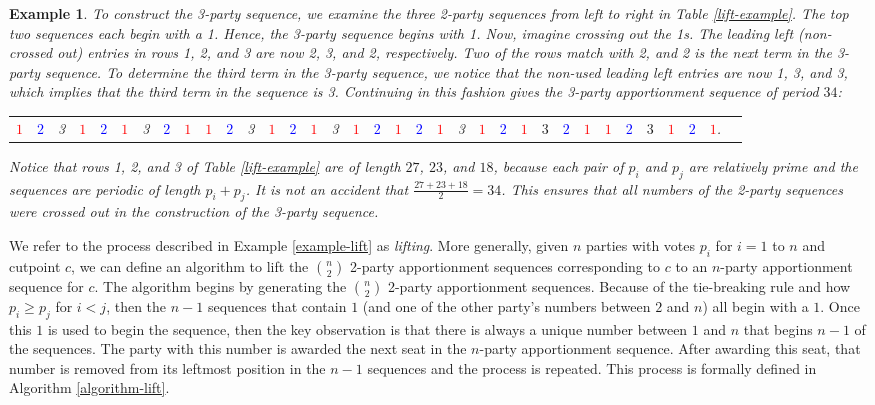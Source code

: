 \documentclass[pdflatex,sn-mathphys-num]{sn-jnl}
\theoremstyle{thmstyleone}%
\theoremstyle{thmstyletwo}%
\newtheorem{example}{Example}%
\theoremstyle{thmstylethree}%
\begin{document}
\begin{example}
To construct the 3-party sequence, we examine the three 2-party sequences from left to right in Table \ref{lift-example}.  The top two sequences each begin with a 1.  Hence, the 3-party sequence begins with 1.  Now, imagine crossing out the 1s. The leading left (non-crossed out) entries in rows 1, 2, and 3 are now 2, 3, and 2, respectively.  Two of the rows match with 2, and 2 is the next term in the 3-party sequence.  To determine the third term in the 3-party sequence, we notice that the non-used leading left entries are now 1, 3, and 3, which implies that the third term in the sequence is 3.  Continuing in this fashion gives the 3-party apportionment sequence of period $34$:

\begin{center}
\renewcommand{\arraystretch}{1.2}
\setlength{\tabcolsep}{2pt}
\begin{tabular}{c*{34}c}
\textcolor{red}{$1$} & \textcolor{blue}{$2$} & 3 & \textcolor{red}{$1$} & \textcolor{blue}{$2$} &\textcolor{red}{$1$} & 3 & \textcolor{blue}{$2$} & \textcolor{red}{$1$} & \textcolor{red}{$1$} & \textcolor{blue}{$2$} & 3 & \textcolor{red}{$1$} & \textcolor{blue}{$2$} & \textcolor{red}{$1$} & 3 & \textcolor{red}{$1$} & \textcolor{blue}{$2$} & \textcolor{red}{$1$} & \textcolor{blue}{$2$} & \textcolor{red}{$1$} & 3 & \textcolor{red}{$1$} & \textcolor{blue}{$2$} & \textcolor{red}{$1$} & $3$ &\textcolor{blue}{$2$} & \textcolor{red}{$1$} & \textcolor{red}{$1$} & \textcolor{blue}{$2$} & $3$ & \textcolor{red}{$1$} & \textcolor{blue}{$2$} & \textcolor{red}{$1$}.  \end{tabular} \end{center}

Notice that rows 1, 2, and 3 of Table \ref{lift-example} are of length $27$, $23$, and $18$, because each pair of $p_i$ and $p_j$ are relatively prime and the sequences are periodic of length $p_i + p_j$.  It is not an accident that $\frac{27+23+18}{2} = 34$. This ensures that all numbers of the 2-party sequences were crossed out in the construction of the 3-party sequence. \end{example}

We refer to the  process described in Example  \ref{example-lift} as {\it lifting}. More generally, given  $n$ parties  with votes $p_i$ for $i =1$ to $n$ and cutpoint $c$, we can define an algorithm to lift the $\binom{n}{2}$ 2-party apportionment sequences  corresponding to $c$ to an $n$-party apportionment sequence for $c$.  The algorithm begins by generating the $\binom{n}{2}$ 2-party apportionment sequences.  Because of the tie-breaking rule and how $p_i \ge p_j$ for $i < j$, then the $n-1$ sequences that contain $1$ (and one of the other party's numbers between $2$ and $n$) all begin with a $1$.  Once this $1$ is used to begin the sequence, then the key  observation is that there is always a unique number between $1$ and $n$ that begins $n-1$ of the sequences. The party with this number is awarded the next seat in the $n$-party apportionment sequence.  After awarding this seat,  that number is removed from its leftmost position in the $n-1$ sequences and the process is repeated.  This process is formally defined in Algorithm \ref{algorithm-lift}. 
\end{document}
